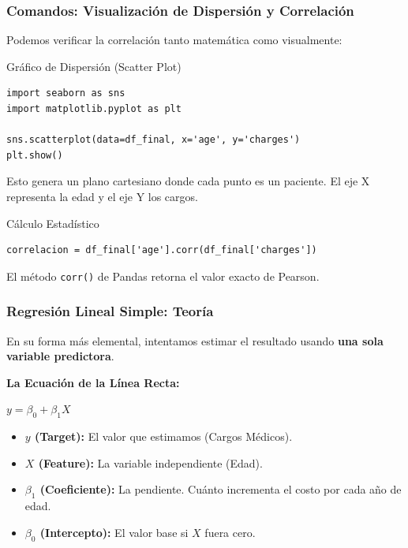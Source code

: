 \documentclass{beamer}
\begin{document}
\begin{frame}[fragile]
\frametitle{Comandos: Visualización de Dispersión y Correlación}
Podemos verificar la correlación tanto matemática como visualmente:

\begin{block}{Gráfico de Dispersión (Scatter Plot)}
\begin{lstlisting}
import seaborn as sns
import matplotlib.pyplot as plt

sns.scatterplot(data=df_final, x='age', y='charges')
plt.show()
\end{lstlisting}
Esto genera un plano cartesiano donde cada punto es un paciente. El eje X representa la edad y el eje Y los cargos.
\end{block}

\begin{block}{Cálculo Estadístico}
\begin{lstlisting}
correlacion = df_final['age'].corr(df_final['charges'])
\end{lstlisting}
El método \texttt{corr()} de Pandas retorna el valor exacto de Pearson.
\end{block}
\end{frame}

\begin{frame}
\frametitle{Regresión Lineal Simple: Teoría}
En su forma más elemental, intentamos estimar el resultado usando \textbf{una sola variable predictora}.

\textbf{La Ecuación de la Línea Recta:}
\begin{center}
\Large $y = \beta_0 + \beta_1 X$
\end{center}
\vspace{0.2cm}
\begin{itemize}
    \item \textbf{$y$ (Target):} El valor que estimamos (Cargos Médicos).
    \item \textbf{$X$ (Feature):} La variable independiente (Edad).
    \item \textbf{$\beta_1$ (Coeficiente):} La pendiente. Cuánto incrementa el costo por cada año de edad.
    \item \textbf{$\beta_0$ (Intercepto):} El valor base si $X$ fuera cero.
\end{itemize}
\end{frame}
\end{document}
